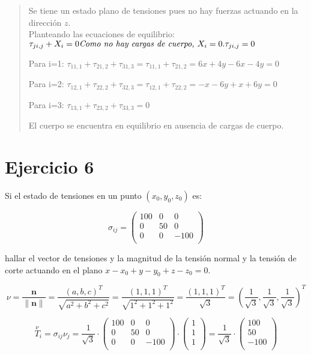 \documentclass[a4paper,12pt,twoside,final,spanish]{article}
\begin{document}
\dotfill

\begin{quote}

Se tiene un estado plano de tensiones pues no hay fuerzas actuando en la dirección $z$.\\

Planteando las ecuaciones de equilibrio:\\
$\tau_{ji,j}+X_{i}=0\hfill\textit{Como no hay cargas de cuerpo, $X_{i}=0$}.\\
\tau_{ji,j}=0$

Para i=1: $\tau_{11,1}+\tau_{21,2}+\tau_{31,3}=\tau_{11,1}+\tau_{21,2}
=6x+4y-6x-4y=0$

Para i=2: $\tau_{12,1}+\tau_{22,2}+\tau_{32,3}=\tau_{12,1}+\tau_{22,2}
=-x-6y+x+6y=0$

Para i=3: $\tau_{13,1}+\tau_{23,2}+\tau_{33,3}=0$

El cuerpo se encuentra en equilibrio en ausencia de cargas de cuerpo.

\end{quote}

\section*{Ejercicio 6}

Si el estado de tensiones en un punto $(x_{0},y_{0},z_{0})$ es:

\[\sigma_{ij}=
\left(\begin{matrix}
100 & 0 & 0\\
0 & 50 & 0\\
0 & 0 & -100\\
\end{matrix}\right)
\]

hallar el vector de tensiones y la magnitud de la tensión normal y la tensión de corte 
actuando en el plano $x-x_{0}+y-y_{0}+z-z_{0}=0$.

\dotfill

\[
\nu=\frac{\mathbf{n}}{\|\mathbf{n}\|}=\frac{(a,b,c)^{T}}{\sqrt{a^2+b^2+c^2}}
=\frac{(1,1,1)^{T}}{\sqrt{1^2+1^2+1^2}}=\frac{(1,1,1)^{T}}{\sqrt{3}}
=\left(\frac{1}{\sqrt{3}},\frac{1}{\sqrt{3}},\frac{1}{\sqrt{3}}\right)^{T}
\]

\[
\stackrel \nu T_{i}=\sigma_{ij}\nu_{j}=\frac{1}{\sqrt{3}}\cdot
\left(\begin{matrix}
100 & 0 & 0\\
0 & 50 & 0\\
0 & 0 & -100\\
\end{matrix}\right)\cdot
\left(\begin{matrix}
1 \\
1 \\
1 \\
\end{matrix}\right)=\frac{1}{\sqrt{3}}\cdot
\left(\begin{matrix}
100 \\
50 \\
-100 \\
\end{matrix}\right)
\]
\end{document}

